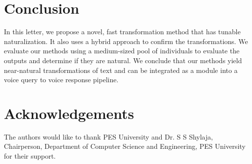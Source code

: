 \documentclass[journal]{IEEEtran}
\begin{document}
\section{Conclusion}

In this letter, we propose a novel, fast transformation method that has tunable naturalization. It also uses a hybrid approach to confirm the transformations. We evaluate our methods using a medium-sized pool of individuals to evaluate the outputs and determine if they are natural. We conclude that our methods yield near-natural transformations of text and can be integrated as a module into a voice query to voice response pipeline.

\section*{Acknowledgements}

The authors would like to thank PES University and Dr. S S Shylaja, Chairperson, Department of Computer Science and Engineering, PES University for their support. 

\end{document}
